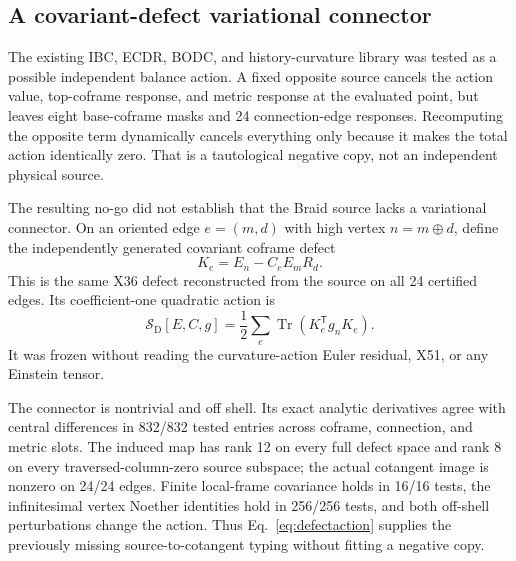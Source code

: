 \documentclass[11pt]{article}
\theoremstyle{definition}
\theoremstyle{remark}
\newcommand{\Tr}{\operatorname{Tr}}
\begin{document}
\subsection{A covariant-defect variational connector}

The existing IBC, ECDR, BODC, and history-curvature library was tested as a possible independent balance action. A fixed opposite source cancels the action value, top-coframe response, and metric response at the evaluated point, but leaves eight base-coframe masks and 24 connection-edge responses. Recomputing the opposite term dynamically cancels everything only because it makes the total action identically zero. That is a tautological negative copy, not an independent physical source.

The resulting no-go did not establish that the Braid source lacks a variational connector. On an oriented edge $e=(m,d)$ with high vertex $n=m\oplus d$, define the independently generated covariant coframe defect
\begin{equation}\label{eq:defectconnector}
 K_e=E_n-C_eE_mR_d.
\end{equation}
This is the same X36 defect reconstructed from the source on all 24 certified edges. Its coefficient-one quadratic action is
\begin{equation}\label{eq:defectaction}
 \mathcal S_{\mathrm D}[E,C,g]
 =\frac12\sum_e\Tr\!\left(K_e^{\mathsf T}g_nK_e\right).
\end{equation}
It was frozen without reading the curvature-action Euler residual, X51, or any Einstein tensor.

The connector is nontrivial and off shell. Its exact analytic derivatives agree with central differences in 832/832 tested entries across coframe, connection, and metric slots. The induced map has rank 12 on every full defect space and rank 8 on every traversed-column-zero source subspace; the actual cotangent image is nonzero on 24/24 edges. Finite local-frame covariance holds in 16/16 tests, the infinitesimal vertex Noether identities hold in 256/256 tests, and both off-shell perturbations change the action. Thus Eq.~\eqref{eq:defectaction} supplies the previously missing source-to-cotangent typing without fitting a negative copy.
\end{document}
